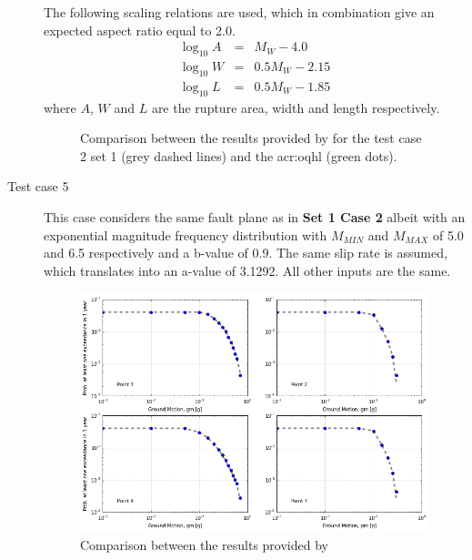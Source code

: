 \begin{description}
        The following scaling relations are used, which in combination give 
        an expected aspect ratio equal to 2.0.
        \begin{eqnarray}
        \log_{10} A &=& M_W - 4.0\\
        \log_{10} W &=& 0.5 M_W - 2.15\\
        \log_{10} L &=& 0.5 M_W - 1.85
        \end{eqnarray}
        where $A$, $W$ and $L$ are the rupture area, width and length
        respectively.
\begin{figure}[!ht]
\centering
\caption{Comparison between the results provided by \textcite{thomas2010}
for the test case 2 set 1 (grey dashed lines) and the \gls{acr:oqhl} 
(green dots). }
\label{fig:peer_set1_test2}
\end{figure}
    \clearpage
    \item [Test case 5]
    This case considers the same fault plane as in \textbf{Set 1 Case 2} 
    albeit with an exponential magnitude frequency distribution with 
    $M_{MIN}$ and $M_{MAX}$ of 5.0 and 6.5 respectively and a b-value 
    of 0.9. The same slip rate is assumed, which translates into an a-value 
    of 3.1292. All other inputs are the same.
\begin{figure}[!ht]
\centering
\includegraphics[width=14cm]{./Pictures/qa/test05_set1.png}
\caption{Comparison between the results provided by \textcite{thomas2010}
}
\end{figure}
\end{description}
